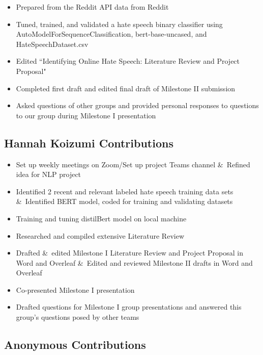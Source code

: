 \documentclass[conference]{IEEEtran}
\begin{document}
\begin{itemize}
  \item Prepared from the Reddit API data from Reddit
  \item Tuned, trained, and validated a hate speech binary classifier using AutoModelForSequenceClassification, bert-base-uncased, and HateSpeechDataset.csv
 \item Edited “Identifying Online Hate Speech: Literature Review and Project Proposal"
 \item Completed first draft and edited final draft of Milestone II submission
 \item Asked questions of other groups and provided personal responses to questions to our group during Milestone I presentation
\end{itemize}

\subsection{Hannah Koizumi Contributions}

\begin{itemize}
  \item Set up weekly meetings on Zoom/Set up project Teams channel \&\ Refined idea for NLP project
  \item Identified 2 recent and relevant labeled hate speech training data sets \&\ Identified BERT model, coded for training and validating datasets
  \item Training and tuning distilBert model on local machine 
  \item Researched and compiled extensive Literature Review
  \item Drafted \&\ edited Milestone I Literature Review and Project Proposal in Word and Overleaf \&\ Edited and reviewed Milestone II drafts in Word and Overleaf
  \item Co-presented Milestone I presentation
  \item Drafted questions for Milestone I group presentations and answered this group's questions posed by other teams
\end{itemize}

\subsection{Anonymous Contributions}
\end{document}

